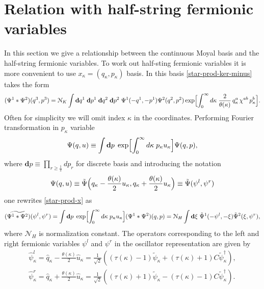 \documentclass[a4paper,12pt]{article}
\newcommand{\Nc}{\mathcal{N}}
\begin{document}
\section{Relation with half-string fermionic variables}
\label{sec:half-fermi}
\setcounter{equation}{0}

In this section we give a relationship between the continuous Moyal basis
and the half-string fermionic variables.
To work out half-sting fermionic variables it is more convenient
to use $x_{\kappa}=(q_{\kappa},p_{\kappa})$ basis.
In this basis \eqref{star-prod-ker-minus} takes the form
\begin{multline}
(\Psi^{1}*\Psi^{2})(q^3,p^3)
=\Nc_{K}
\int\mathbf{d}q^{1}\;\mathbf{d}p^{1}\;\mathbf{d}q^{2}\;\mathbf{d}p^{2}\;
\Psi^{1}(-q^{1},-p^{1})
\Psi^{2}(q^{2},p^{2})\exp\Bigl[\int_{0}^{\infty}d\kappa\;
\frac{2}{\theta(\kappa)}\,
q^{a}_{\kappa}\,\chi^{ab}\,p^{b}_{\kappa}\Bigr].
\label{star-prod-x}
\end{multline}
Often for simplicity we will omit index $\kappa$ in the coordinates.
Performing Fourier transformation in $p_{\kappa}$ variable
\begin{gather}
\Psi(q,u)\equiv\int \mathbf{d}p\; \exp\Bigl[\int_{0}^{\infty}d\kappa\;
 p_{\kappa}u_{\kappa}\Bigr]\Psi(q,p),
\end{gather}
where $\mathbf{d}p\equiv\prod_{r\geq\tfrac12}dp_{r}$ for discrete basis and
introducing the notation
\begin{gather}
\Psi(q,u)\equiv\tilde{\Psi}\Bigl(q_{\kappa}-\frac{\theta(\kappa)}{2}u_{\kappa},
q_{\kappa}+\frac{\theta(\kappa)}{2}u_{\kappa}\Bigr)
\equiv\tilde{\Psi}(\psi^{l},\psi^{r})
\end{gather}
one rewrites \eqref{star-prod-x} as
\begin{gather}
(\widetilde{\Psi^{1}*\Psi^{2}})(\psi^{l},\psi^{r})
=\int \mathbf{d}p\; \exp\Bigl[\int_{0}^{\infty}d\kappa\;
 p_{\kappa}u_{\kappa}\Bigr](\Psi^{1}*\Psi^{2})(q,p)
=\Nc_{H}\int \mathbf{d}\xi\;
\tilde{\Psi}^{1}(-\psi^{l},-\xi)
\tilde{\Psi}^{2}(\xi,\psi^{r}),
\label{star-half-ful}
\end{gather}
where $\Nc_{H}$ is normalization constant.
The operators corresponding to the left and right
fermionic variables $\psi^{l}$ and $\psi^{r}$
in the oscillator representation are given by
\begin{subequations}
\begin{gather}
\hat{\psi}^{l}_{\kappa}
=\hat{q}_{\kappa}-\frac{\theta(\kappa)}{2}\hat{u}_{\kappa}=
\frac{1}{\sqrt{2}}((\tau(\kappa)-1)\tilde{\psi}_{\kappa}
+(\tau(\kappa)+1)C\tilde{\psi}_{\kappa}^{\dag}),\\
\hat{\psi}^{r}_{\kappa}
=\hat{q}_{\kappa}+\frac{\theta(\kappa)}{2}\hat{u}_{\kappa}=
\frac{1}{\sqrt{2}}((\tau(\kappa)+1)\tilde{\psi}_{\kappa}
-(\tau(\kappa)-1)C\tilde{\psi}_{\kappa}^{\dag}).
\end{gather}
\label{half-str}
\end{subequations}
\end{document}
